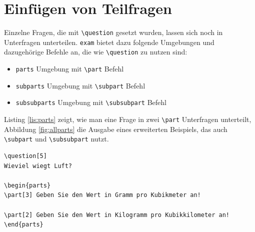 \clearpage

\section{Einfügen von Teilfragen}

Einzelne Fragen, die mit \texttt{\textbackslash question} gesetzt wurden, lassen sich noch in Unterfragen unterteilen. \texttt{exam} bietet dazu folgende Umgebungen und dazugehörige Befehle an, die wie \texttt{\textbackslash question} zu nutzen sind:

\begin{itemize}
	\item \texttt{parts} Umgebung mit \texttt{\textbackslash part} Befehl
	\item \texttt{subparts} Umgebung mit \texttt{\textbackslash subpart} Befehl
	\item \texttt{subsubparts} Umgebung mit \texttt{\textbackslash subsubpart} Befehl
\end{itemize}

Listing \ref{lis:parts} zeigt, wie man eine Frage in zwei \texttt{\textbackslash part} Unterfragen unterteilt, Abbildung \ref{fig:allparts} die Ausgabe eines erweiterten Beispiels, das auch \texttt{\textbackslash subpart} und \texttt{\textbackslash subsubpart} nutzt.

\begin{lstlisting}[caption={Beispiel für die Nutzung von \texttt{parts} und \texttt{\textbackslash part}}, label={lis:parts}]
\question[5]
Wieviel wiegt Luft?

\begin{parts}
\part[3] Geben Sie den Wert in Gramm pro Kubikmeter an!

\part[2] Geben Sie den Wert in Kilogramm pro Kubikkilometer an!
\end{parts}
\end{lstlisting}


